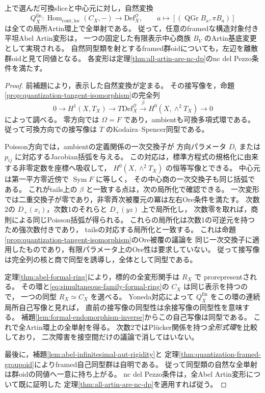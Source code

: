 \begin{theorem}[同じ有限型中心商の全Artin普遍性]
\label{thm:simultaneous-central-all-artin}
上で選んだ可換sliceと中心元に対し，自然変換
\[
 Q^{\mathrm{fin}}_X:
 \operatorname{Hom}_{\mathrm{cont},\mathrm{loc}}(C_X,-)
 \longrightarrow\mathrm{Def}^{\mathcal O}_X,
 \qquad a\longmapsto[(\operatorname{QGr}B_a,\pi B_a)]
\]
は全ての局所Artin環上で全単射である。
従って，任意のframedな構造対象付き平坦Abel Artin変形は，
一つの固定した有限表示中心商族 $B_V$ のArtin基底変更として実現される。
自然同型類を射とするframed群oidについても，左辺を離散群oidと見て同値となる。
各変形は定理\ref{thm:all-artin-are-nc-dp}のnc del Pezzo条件を満たす。
\end{theorem}
\begin{proof}
前補題により，表示した自然変換が定まる。
その接写像を，命題\ref{prop:quantization-tangent-isomorphism}の完全列
\[
 0\longrightarrow H^1(X,T_X)
  \longrightarrow T\mathrm{Def}^{\mathcal O}_X
  \xrightarrow{\beta}H^0(X,\wedge^2T_X)\longrightarrow0
\]
によって調べる。
零方向では $\Omega=F$ であり，ambientも可換多項式環である。
従って可換方向での接写像は $T$ のKodaira--Spencer同型である。

Poisson方向では，ambientの定義関係の一次交換子が
方向パラメータ $D_i$ または $p_{ij}$ に対応するJacobian括弧を与える。
この対応は，標準方程式の規格化に由来する非零定数を座標へ吸収して，
$H^0(X,\wedge^2T_X)$ の恒等写像とできる。
中心元は第一平方零近傍で $\operatorname{Sym}F$ に等しく，
その中心商の一次交換子も同じ括弧である。
これがtails上の $\beta$ と一致する点は，次の局所化で確認できる。
一次変形では二重交換子が零であり，非零斉次被覆元の冪は左右Ore条件を満たす。
次数2の $D_+(x_i)$，次数1のそれらと $D_+(yz)$ 上で局所化し，
次数零を取れば，商則による同じPoisson括弧が得られる。
これらの局所化は次数1の可逆元を持つため強次数付きであり，
tailsの対応する局所化と一致する。
これは命題\ref{prop:quantization-tangent-isomorphism}のOre被覆の議論を
同じ一次交換子に適用したものであり，有限パラメータ上のOre性は要求していない。
従って接写像は完全列の核と商で同型を誘導し，全体として同型である。

定理\ref{thm:abel-formal-ring}により，標的の全変形関手は $R_X$ で
prorepresentされる。
その環と\eqref{eq:simultaneous-family-formal-ring}の $C_X$ は同じ表示を持つので，
一つの同型 $R_X\simeq C_X$ を選べる。
Yoneda対応によって $Q^{\mathrm{fin}}_X$ をこの環の連続局所自己写像と見れば，
直前の接写像の同型性は余接写像の同型性を意味する。
補題\ref{lem:formal-endomorphism-inverse}からこの自己写像は同型である。
これで全Artin環上の全単射を得る。
次数2ではPl\"ucker関係を持つ\emph{全形式環}を比較しており，
二次障害を接空間だけの議論で消してはいない。

最後に，補題\ref{lem:abel-infinitesimal-aut-rigidity}と
定理\ref{thm:quantization-framed-groupoid}によりframed自己同型群は自明である。
従って同型類の自然な全単射は群oidの同値へ一意に持ち上がる。
nc del Pezzo条件は，全Abel Artin変形について既に証明した
定理\ref{thm:all-artin-are-nc-dp}を適用すれば従う。
\end{proof}

